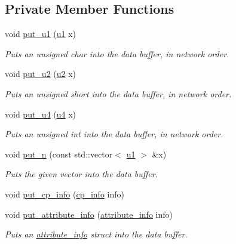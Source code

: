 \subsection*{Private Member Functions}
\begin{DoxyCompactItemize}
\item 
void \hyperlink{classClassWriter_a07332eb8e8e5ead72834e286cf8a6bd4}{put\+\_\+u1} (\hyperlink{types_8h_a162f47a77ee24f6f77cd8c82ccd40ab7}{u1} x)
\begin{DoxyCompactList}\small\item\em Puts an unsigned char into the data buffer, in network order. \end{DoxyCompactList}\item 
void \hyperlink{classClassWriter_a0304019dd68dd830fac5c67971ed2070}{put\+\_\+u2} (\hyperlink{types_8h_ae676e9207f57fb921dca7366b2f59c53}{u2} x)
\begin{DoxyCompactList}\small\item\em Puts an unsigned short into the data buffer, in network order. \end{DoxyCompactList}\item 
void \hyperlink{classClassWriter_aa6a42ab1ec0c2f85c30896506d6dbfce}{put\+\_\+u4} (\hyperlink{types_8h_af3b2d4b29fd9faedc984db3e062b3d5d}{u4} x)
\begin{DoxyCompactList}\small\item\em Puts an unsigned int into the data buffer, in network order. \end{DoxyCompactList}\item 
void \hyperlink{classClassWriter_aa527b917e9f3628ceaeccb95d30bfbb9}{put\+\_\+n} (const std\+::vector$<$ \hyperlink{types_8h_a162f47a77ee24f6f77cd8c82ccd40ab7}{u1} $>$ \&x)
\begin{DoxyCompactList}\small\item\em Puts the given vector into the data buffer. \end{DoxyCompactList}\item 
void \hyperlink{classClassWriter_a47741e12ae2af256ce3a58a41b2d04d6}{put\+\_\+cp\+\_\+info} (\hyperlink{structcp__info}{cp\+\_\+info} info)
\item 
void \hyperlink{classClassWriter_aeb256dbd55728dcc9081560691da779b}{put\+\_\+attribute\+\_\+info} (\hyperlink{structattribute__info}{attribute\+\_\+info} info)
\begin{DoxyCompactList}\small\item\em Puts an \hyperlink{structattribute__info}{attribute\+\_\+info} struct into the data buffer. \end{DoxyCompactList}\item 

\end{DoxyCompactItemize}
